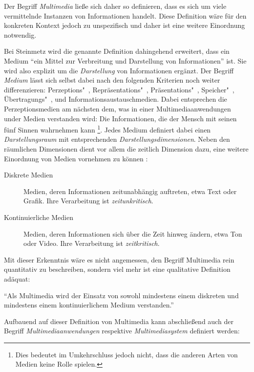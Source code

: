   Der Begriff \emph{Multimedia} ließe sich daher so definieren, dass es sich um viele vermittelnde Instanzen von Informationen handelt. Diese Definition wäre für den konkreten Kontext jedoch zu unspezifisch und daher ist eine weitere Einordnung notwendig.
  
  Bei Steinmetz wird die genannte Definition dahingehend erweitert, dass ein Medium "`ein Mittel zur Verbreitung und Darstellung von Informationen"' \citep[S. 7]{multimedia_technologie} ist. Sie wird also explizit um die \emph{Darstellung} von Informationen ergänzt. Der Begriff \emph{Medium} lässt sich selbst dabei nach den folgenden Kriterien noch weiter differenzieren: Perzeptions"~, Repräsentations"~, Präsentations"~, Speicher"~, Übertragungs"~, und Informationsaustauschmedien. Dabei entsprechen die Perzeptionsmedien am nächsten dem, was in einer Multimediaanwendungen under Medien verstanden wird: Die Informationen, die der Mensch mit seinen fünf Sinnen wahrnehmen kann \citep[S. 9]{multimedia_technologie}\footnote{Dies bedeutet im Umkehrschluss jedoch nicht, dass die anderen Arten von Medien keine Rolle spielen.}. Jedes Medium definiert dabei einen \emph{Darstellungsraum} mit entsprechenden \emph{Darstellungsdimensionen}. Neben den räumlichen Dimensionen dient vor allem die zeitlich Dimension dazu, eine weitere Einordnung von Medien vornehmen zu können \citep[S. 10]{multimedia_technologie}:
  
  \begin{description}
    \item[Diskrete Medien] Medien, deren Informationen zeitunabhängig auftreten, etwa Text oder Grafik. Ihre Verarbeitung ist \emph{zeitunkritisch}.
    \item[Kontinuierliche Medien] Medien, deren Informationen sich über die Zeit hinweg ändern, etwa Ton oder Video. Ihre Verarbeitung ist \emph{zeitkritisch}.
  \end{description}

  Mit dieser Erkenntnis wäre es nicht angemessen, den Begriff Multimedia rein quantitativ zu beschreiben, sondern viel mehr ist eine qualitative Definition adäquat:

  \begin{definition}[Multimedia]\label{def:multimedia}
    "`Als Multimedia wird der Einsatz von sowohl mindestens einem diskreten und mindestens einem kontinuierlichem Medium verstanden."' \emph{\citep[S. 14]{multimedia_technologie}}
  \end{definition}
  
  Aufbauend auf dieser Definition von Multimedia kann abschließend auch der Begriff \emph{Multimediaanwendungen} respektive \emph{Multimediasystem} definiert werden:

